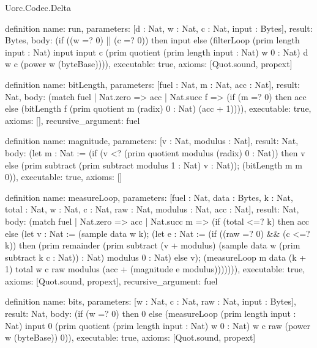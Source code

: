 \begin{lexlean}{Uorc.Codec.Delta}
\begin{semanticmodule}
definition{
  name: run,
  parameters: [d : Nat, w : Nat, c : Nat, input : Bytes],
  result: Bytes,
  body: (if ((w =? 0) || (c =? 0)) then input else (filterLoop (prim length input : Nat) input input c (prim quotient (prim length input : Nat) w 0 : Nat) d w c (power w (byteBase)))),
  executable: true,
  axioms: [Quot.sound, propext]
}

definition{
  name: bitLength,
  parameters: [fuel : Nat, m : Nat, acc : Nat],
  result: Nat,
  body: (match fuel
    | Nat.zero => acc
    | Nat.succ f => (if (m =? 0) then acc else (bitLength f (prim quotient m (radix) 0 : Nat) (acc + 1)))),
  executable: true,
  axioms: [],
  recursive_argument: fuel
}

definition{
  name: magnitude,
  parameters: [v : Nat, modulus : Nat],
  result: Nat,
  body: (let m : Nat := (if (v <? (prim quotient modulus (radix) 0 : Nat)) then v else (prim subtract (prim subtract modulus 1 : Nat) v : Nat)); (bitLength m m 0)),
  executable: true,
  axioms: []
}

definition{
  name: measureLoop,
  parameters: [fuel : Nat, data : Bytes, k : Nat, total : Nat, w : Nat, c : Nat, raw : Nat, modulus : Nat, acc : Nat],
  result: Nat,
  body: (match fuel
    | Nat.zero => acc
    | Nat.succ m => (if (total <=? k) then acc else (let v : Nat := (sample data w k); (let e : Nat := (if ((raw =? 0) && (c <=? k)) then (prim remainder (prim subtract (v + modulus) (sample data w (prim subtract k c : Nat)) : Nat) modulus 0 : Nat) else v); (measureLoop m data (k + 1) total w c raw modulus (acc + (magnitude e modulus))))))),
  executable: true,
  axioms: [Quot.sound, propext],
  recursive_argument: fuel
}

definition{
  name: bits,
  parameters: [w : Nat, c : Nat, raw : Nat, input : Bytes],
  result: Nat,
  body: (if (w =? 0) then 0 else (measureLoop (prim length input : Nat) input 0 (prim quotient (prim length input : Nat) w 0 : Nat) w c raw (power w (byteBase)) 0)),
  executable: true,
  axioms: [Quot.sound, propext]
}
\end{semanticmodule}
\end{lexlean}

